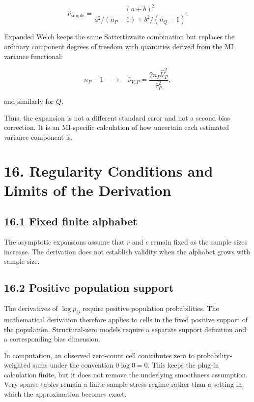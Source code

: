 \documentclass[
  11pt]{article}
\let\originalsection\section
\renewcommand{\section}{\clearpage\originalsection}
\begin{document}
\begin{equation}
\widehat\nu_{\mathrm{simple}}
=\frac{(a+b)^2}
{a^2/(n_P-1)+b^2/(n_Q-1)}.
\end{equation}

Expanded Welch keeps the same Satterthwaite combination but replaces the
ordinary component degrees of freedom with quantities derived from the
MI variance functional:

\begin{equation}
n_P-1
\quad\longrightarrow\quad
\widehat\nu_{V,P}
=\frac{2n_P\widehat V_P^2}{\widehat\tau_P^2},
\end{equation}

and similarly for \(Q\).

Thus, the expansion is not a different standard error and not a second
bias correction. It is an MI-specific calculation of how uncertain each
estimated variance component is.

\section{16. Regularity Conditions and Limits of the
Derivation}\label{regularity-conditions-and-limits-of-the-derivation}

\subsection{16.1 Fixed finite alphabet}\label{fixed-finite-alphabet}

The asymptotic expansions assume that \(r\) and \(c\) remain fixed as
the sample sizes increase. The derivation does not establish validity
when the alphabet grows with sample size.

\subsection{16.2 Positive population
support}\label{positive-population-support}

The derivatives of \(\log p_{ij}\) require positive population
probabilities. The mathematical derivation therefore applies to cells in
the fixed positive support of the population. Structural-zero models
require a separate support definition and a corresponding bias
dimension.

In computation, an observed zero-count cell contributes zero to
probability-weighted sums under the convention \(0\log 0=0\). This keeps
the plug-in calculation finite, but it does not remove the underlying
smoothness assumption. Very sparse tables remain a finite-sample stress
regime rather than a setting in which the approximation becomes exact.
\end{document}
